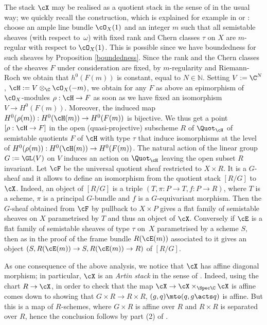 The stack $\cX$ may be realised as a quotient stack in the sense of \cite[Def.\,3.1]{Alper} in the usual way; we quickly recall the construction, which is explained for example in \cite[\S 4.3]{HL} or \cite[Ex.\,8.7]{Alper13}: choose an ample line bundle $\cO_X(1)$ and an integer $m$ such that all semistable sheaves (with respect to~$\omega$) with fixed rank and Chern classes $\tau$ on $X$ are $m$-regular with respect to $\cO_X(1)$.
This is possible since we have boundedness for such sheaves by Proposition \ref{boundedness}. Since the rank and the Chern classes of the sheaves $F$ under consideration are fixed, by $m$-regularity and Riemann-Roch we obtain that $h^0(F(m))$ is constant, equal to $N \in \mathbb{N}$.
Setting $V:=\C^N$, $\cH:=V\otimes_\C\cO_X(-m)$, we obtain for any $F$ as above an epimorphism of $\cO_X$-modules
$\rho:\cH\to F$
as soon as we have fixed an isomorphism $V\to H^0(F(m))$.
Moreover, the induced map $H^0(\rho(m)):H^0(\cH(m))\to H^0(F(m))$ is bijective. We thus get a point $[\rho:\cH\to F]$ in the open (quasi-projective) subscheme $R$ of $\Quot_\cH$ of semistable quotients $F$ of $\cH$ with type $\tau$ that induce isomorphisms at the level of $H^0(\rho(m)):H^0(\cH(m))\to H^0(F(m))$. The natural action of the linear group $G:=\GL(V)$ on $V$ induces an action on $\Quot_\cH$ leaving the open subset $R$ invariant. Let $\cF$ be the universal quotient sheaf restricted to $X\times R$. It is a $G$-sheaf and it allows to define an isomorphism from the quotient stack $[R/G]$ to $\cX$. Indeed, an object of $[R/G]$
is a triple $(T,\pi:P\to T, f:P\to R)$, where $T$ is a scheme, $\pi$ is a principal $G$-bundle and $f$ is a $G$-equivariant morphism. Then the $G$-sheaf obtained from $\cF$ by pullback to $X\times P$ gives a flat family of semistable sheaves on $X$ parametrised by $T$ and thus an object of $\cX$.
Conversely if $\cE$ is a flat family of semistable sheaves of type $\tau$ on~$X$ parametrised by a scheme $S$, then as in the proof of \cite[Lem.\,4.3.1]{HL} the frame bundle $R(\cE(m))$ associated to it gives an object $(S,R(\cE(m))\to S,R(\cE(m))\to R)$ of $[R/G]$.

As one consequence of the above analysis, we notice that $\cX$ has affine diagonal morphism; in particular, $\cX$ is
an \emph{Artin stack} in the sense of \cite[\S2]{Alper13}. Indeed, using the chart $R\to\cX$, in order to check that the map $\cX\to\cX\times_{\Spec \C}\cX$ is affine comes down to showing that $G\times R\to R\times R$, $(g,q)\mto(q,g\acts q)$ is affine. But this is a map of $R$-schemes, where $G\times R$ is affine over $R$ and $R\times R$ is separated over $R$, hence the conclusion follows by part (2) of \cite[\href{https://stacks.math.columbia.edu/tag/01SG}{Tag\,01SG}]{stacks-project}.

